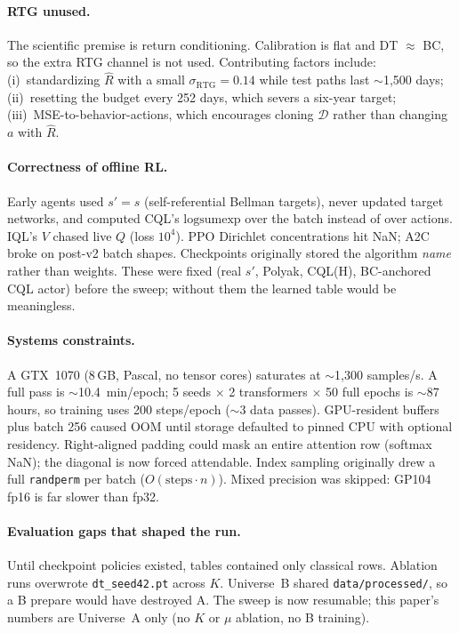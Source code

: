 \documentclass[11pt]{article}
\begin{document}
\paragraph{RTG unused.}
The scientific premise is return conditioning. Calibration is flat and DT $\approx$ BC, so the extra RTG channel is not used. Contributing factors include: (i)~standardizing $\hat{R}$ with a small $\sigma_{\mathrm{RTG}}=0.14$ while test paths last $\sim$1{,}500 days; (ii)~resetting the budget every 252 days, which severs a six-year target; (iii)~MSE-to-behavior-actions, which encourages cloning $\mathcal{D}$ rather than changing $a$ with $\hat{R}$.

\paragraph{Correctness of offline RL.}
Early agents used $s'=s$ (self-referential Bellman targets), never updated target networks, and computed CQL's $\mathrm{logsumexp}$ over the batch instead of over actions. IQL's $V$ chased live $Q$ (loss $10^4$). PPO Dirichlet concentrations hit NaN; A2C broke on post-v2 batch shapes. Checkpoints originally stored the algorithm \emph{name} rather than weights. These were fixed (real $s'$, Polyak, CQL(H), BC-anchored CQL actor) before the sweep; without them the learned table would be meaningless.

\paragraph{Systems constraints.}
A GTX~1070 (8\,GB, Pascal, no tensor cores) saturates at $\sim$1{,}300 samples/s. A full pass is $\sim$10.4~min/epoch; 5 seeds $\times$ 2 transformers $\times$ 50 full epochs is $\sim$87 hours, so training uses 200 steps/epoch ($\sim$3 data passes). GPU-resident buffers plus batch 256 caused OOM until storage defaulted to pinned CPU with optional residency. Right-aligned padding could mask an entire attention row (softmax NaN); the diagonal is now forced attendable. Index sampling originally drew a full \texttt{randperm} per batch ($O(\text{steps}\cdot n)$). Mixed precision was skipped: GP104 fp16 is far slower than fp32.

\paragraph{Evaluation gaps that shaped the run.}
Until checkpoint policies existed, tables contained only classical rows. Ablation runs overwrote \texttt{dt\_seed42.pt} across $K$. Universe~B shared \texttt{data/processed/}, so a B prepare would have destroyed A. The sweep is now resumable; this paper's numbers are Universe~A only (no $K$ or $\mu$ ablation, no B training).
\end{document}
